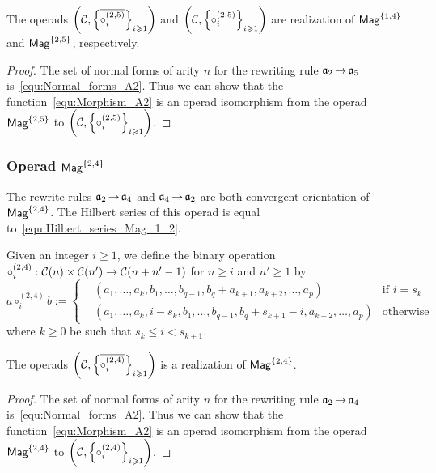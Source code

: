 \begin{Proposition} \label{prop:Realisation_Mag_1_4}
The operads
$\left(\mathcal{C}, \left\{\overline{\circ_i^{(2,5)}}\right\}_{i \geqslant 1}
\right)$ and
$\left(\mathcal{C}, \left\{\circ_i^{(2,5)}\right\}_{i \geqslant 1}\right)$
are realization of $\mathsf{Mag}^{\{1, 4\}}$ and $\mathsf{Mag}^{\{2, 5\}}$, respectively.
\end{Proposition}

\begin{proof}
The set of normal forms of arity $n$ for the rewriting rule
$\mathfrak{a}_2 \operatorname{\to} \mathfrak{a}_5$ is~\eqref{equ:Normal_forms_A2}. Thus we can show that
 the function~\eqref{equ:Morphism_A2}
is an operad isomorphism from the operad $\mathsf{Mag}^{\{2, 5\}}$ to
$\left(\mathcal{C}, \left\{\circ_i^{(2,5)}\right\}_{i \geqslant 1}\right)$.
\end{proof}
\medbreak

\subsubsection{Operad $\mathsf{Mag}^{\{2, 4\}}$}
The rewrite rules $\mathfrak{a}_2 \operatorname{\to} \mathfrak{a}_4$ and $\mathfrak{a}_4 \operatorname{\to} \mathfrak{a}_2$ are both
convergent orientation of $\mathsf{Mag}^{\{2, 4\}}$. The Hilbert series of
this operad is equal
to~\eqref{equ:Hilbert_series_Mag_1_2}.
\medbreak

Given an integer $i \geq 1$, we define the
binary operation
$\circ_i^{(2,4)} : \mathcal{C}(n) \times \mathcal{C}(n')\rightarrow
 \mathcal{C}(n + n' -1)$ for
$n \geq i$ and $n' \geq 1$ by
\begin{equation}
a \circ_i^{(2,4)} b := \left\{
    \begin{split}
    & (a_1, \dots, a_{k}, b_1, \dots, b_{q-1}, b_{q} + a_{k+1},
    a_{k+2}, \dots ,a_{p}) & \text{if } i = s_k\\
    & (a_1, \dots, a_{k}, i - s_{k}, b_1, \dots, b_{q-1}, b_{q}
     + s_{k+1} - i, a_{k+2}, \dots ,a_{p}) & \text{otherwise}
    \end{split}
  \right.
\end{equation}
where $k \geq 0$  be such that $s_k \leq i < s_{k+1}$.

\begin{Proposition} \label{prop:Realisation_Mag_2_4}
The operads
$\left(\mathcal{C}, \left\{\overline{\circ_i^{(2,4)}}\right\}_{i \geqslant 1}
\right)$ is a realization of $\mathsf{Mag}^{\{2, 4\}}$.
\end{Proposition}

\begin{proof}
The set of normal forms of arity $n$ for the rewriting rule
$\mathfrak{a}_2 \operatorname{\to} \mathfrak{a}_4$ is~\eqref{equ:Normal_forms_A2}. Thus we can show that
 the function~\eqref{equ:Morphism_A2}
is an operad isomorphism from the operad $\mathsf{Mag}^{\{2, 4\}}$ to
$\left(\mathcal{C}, \left\{\circ_i^{(2,4)}\right\}_{i \geqslant 1}\right)$.
\end{proof}
\medbreak

